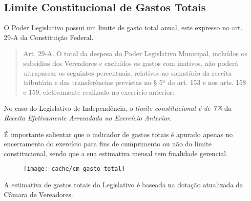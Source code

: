 
\subsection[Gastos Totais]{Limite Constitucional de Gastos Totais}

O Poder Legislativo possui um limite de gasto total anual, este expresso no art. 29-A da Constituição Federal.

\begin{quotation}
Art.  29-A.  O total da despesa do Poder Legislativo Municipal, incluídos os subsídios dos Vereadores e excluídos os gastos com inativos, não poderá ultrapassar os seguintes percentuais, relativos ao somatório da receita tributária e das transferências previstas no § 5º do art. 153 e nos arts. 158 e 159, efetivamente realizado no exercício anterior:
\end{quotation}

No caso do Legislativo de Independência, o \textit{limite constitucional é de 7\%} da \textit{Receita Efetivamente Arrecadada no Exercício Anterior}.



É importante salientar que o indicador de gastos totais é apurado apenas no encerramento do exercício para fins de cumprimento ou não do limite constitucional, sendo que a sua estimativa mensal tem finalidade gerencial.

\begin{figure}[H]
\center
\texttt{[image: cache/cm\_gasto\_total]}
\end{figure}

A estimativa de gastos totais do Legislativo é baseada na dotação atualizada da Câmara de Vereadores.
